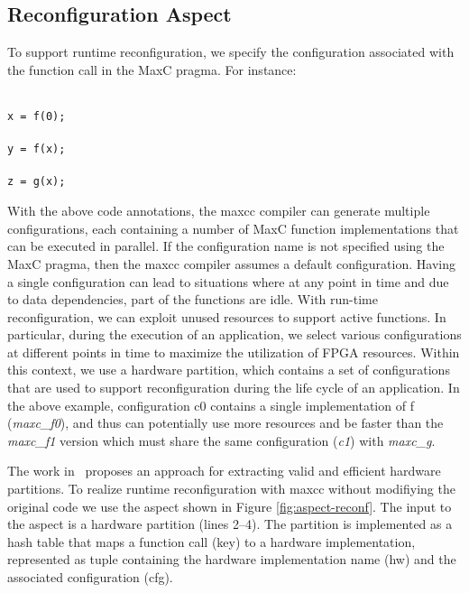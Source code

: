 \subsection{Reconfiguration Aspect}
\label{sect:asp_reconfig}
To support runtime reconfiguration, we specify the configuration associated with the function call in the MaxC pragma. For instance:

\noindent\texttt{\footnotesize{\\
x = f(0); \\
\\
y = f(x); \\
\\
z = g(x); \\
}}

\noindent With the above code annotations, the maxcc compiler can generate multiple configurations, each containing  a number of MaxC function implementations that can be executed in parallel. If the configuration name is not specified using the MaxC pragma, then the maxcc compiler assumes a default configuration. Having a single configuration can lead to situations where at any point in time and due to data dependencies, part of the functions are idle. With run-time reconfiguration, we can exploit unused resources to support active functions. In particular, during the execution of an application, we select various configurations at different points in time to maximize the utilization of FPGA resources. Within this context, we use a hardware partition, which contains a set of configurations that are used to support reconfiguration during the life cycle of an application. In the above example, configuration c0 contains a single implementation of f (\emph{maxc\_f0}), and thus can potentially use more resources and be faster than the \emph{maxc\_f1} version which must share the same configuration (\emph{c1}) with \emph{maxc\_g}.

The work in~\cite{Xinyu:Qiwei:Luk:Qiang:Pell:2012} proposes an
approach for extracting valid and efficient hardware partitions. To realize
runtime reconfiguration with maxcc without modifiying the original code we use the
aspect shown in Figure \ref{fig:aspect-reconf}.  The input to the
aspect is a hardware partition (lines 2--4). The partition is implemented as a
hash table that maps a function call (key) to a hardware
implementation, represented as tuple containing the hardware
implementation name (hw) and the associated configuration (cfg).

